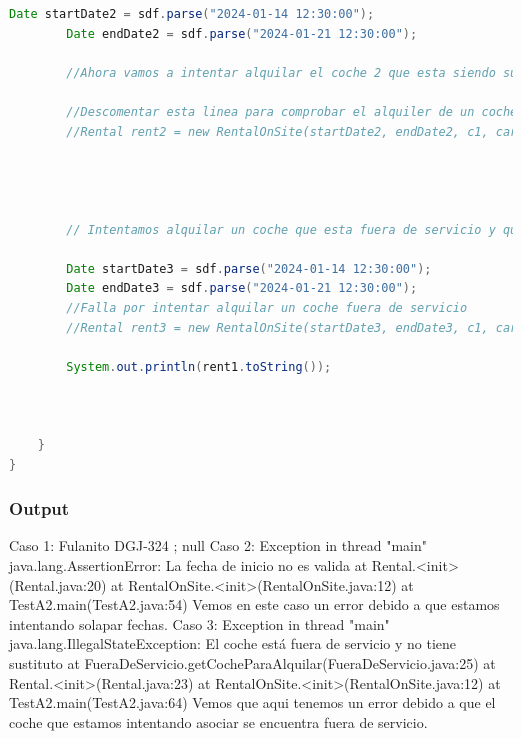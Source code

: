 \begin{lstlisting}[style = javaNormal, language=Java]
        Date startDate2 = sdf.parse("2024-01-14 12:30:00");
        Date endDate2 = sdf.parse("2024-01-21 12:30:00");

        //Ahora vamos a intentar alquilar el coche 2 que esta siendo sustituto del coche 1

        //Descomentar esta linea para comprobar el alquiler de un coche sustituto
        //Rental rent2 = new RentalOnSite(startDate2, endDate2, c1, car2, office1);




        // Intentamos alquilar un coche que esta fuera de servicio y que not tiene sustituto:

        Date startDate3 = sdf.parse("2024-01-14 12:30:00");
        Date endDate3 = sdf.parse("2024-01-21 12:30:00");
        //Falla por intentar alquilar un coche fuera de servicio
        //Rental rent3 = new RentalOnSite(startDate3, endDate3, c1, car3, office1);

        System.out.println(rent1.toString());



    }
}
\end{lstlisting}
\subsubsection*{Output}
Caso 1: 
\vspace{0.15cm}
Fulanito DGJ-324 ; null
\vspace{0.15cm}
Caso 2:
\vspace{0.15cm}
Exception in thread "main" java.lang.AssertionError: La fecha de inicio no es valida
        at Rental.<init>(Rental.java:20)
        at RentalOnSite.<init>(RentalOnSite.java:12)
        at TestA2.main(TestA2.java:54)
\vspace{0.15cm}
Vemos en este caso un error debido a que estamos intentando solapar fechas.
Caso 3:
\vspace{0.15cm}
Exception in thread "main" java.lang.IllegalStateException: El coche está fuera de servicio y no tiene sustituto
        at FueraDeServicio.getCocheParaAlquilar(FueraDeServicio.java:25)
        at Rental.<init>(Rental.java:23)
        at RentalOnSite.<init>(RentalOnSite.java:12)
        at TestA2.main(TestA2.java:64)
        \vspace{0.15cm}
Vemos que aqui tenemos un error debido a que el coche que estamos intentando asociar se encuentra fuera de servicio.
        \newpage